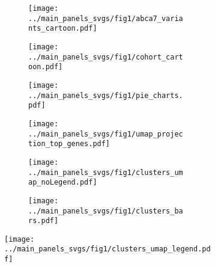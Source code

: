 \documentclass[12pt]{article}
\begin{document}
\begin{figure}[H]
    \begin{subfigure}[t]{.45\textwidth}
        \begin{subfigure}[t]{\textwidth}
            \caption{}
            \texttt{[image: ../main\_panels\_svgs/fig1/abca7\_variants\_cartoon.pdf]}        
        \end{subfigure}
        \begin{subfigure}[t]{\textwidth}
            \caption{}
            \texttt{[image: ../main\_panels\_svgs/fig1/cohort\_cartoon.pdf]}        
        \end{subfigure}
        \begin{subfigure}[t]{\textwidth}
            \caption{}
            \texttt{[image: ../main\_panels\_svgs/fig1/pie\_charts.pdf]}        
        \end{subfigure}
    \end{subfigure}       
    \begin{subfigure}[t]{.55\textwidth}
        \begin{subfigure}[t]{\textwidth}
            \caption{}
            \texttt{[image: ../main\_panels\_svgs/fig1/umap\_projection\_top\_genes.pdf]}        
        \end{subfigure}
    \end{subfigure}
    \begin{subfigure}[t]{0.3\textwidth}
        \begin{subfigure}[t]{\textwidth}
            \caption{}
            \texttt{[image: ../main\_panels\_svgs/fig1/clusters\_umap\_noLegend.pdf]}        
        \end{subfigure}
        \begin{subfigure}[t]{\textwidth}
            \caption{}
            \texttt{[image: ../main\_panels\_svgs/fig1/clusters\_bars.pdf]}        
        \end{subfigure}
    \end{subfigure}
    \begin{subfigure}[t]{0.7\textwidth}
        \caption{}
        \texttt{[image: ../main\_panels\_svgs/fig1/clusters\_umap\_legend.pdf]}        
    \end{subfigure}      




\end{figure}
\end{document}

